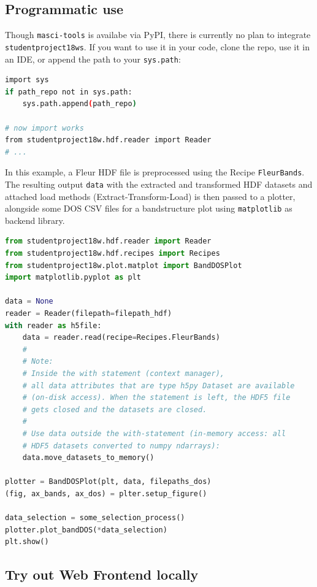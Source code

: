 \subsection{Programmatic use}\label{programmatic-use}

Though \texttt{masci-tools} is availabe via PyPI, there is currently no
plan to integrate \texttt{studentproject18ws}. If you want to use it in
your code, clone the repo, use it in an IDE, or append the path to your
\texttt{sys.path}:

\begin{lstlisting}[language=bash, style=code]
import sys
if path_repo not in sys.path:
    sys.path.append(path_repo)
    
# now import works
from studentproject18w.hdf.reader import Reader
# ...
\end{lstlisting}

In this example, a Fleur HDF file is preprocessed using the Recipe
\texttt{FleurBands}. The resulting output \texttt{data} with the
extracted and transformed HDF datasets and attached load methods
(Extract-Transform-Load) is then passed to a plotter, alongside some DOS
CSV files for a bandstructure plot using \texttt{matplotlib} as backend
library.

\begin{lstlisting}[language=python, style=code]
from studentproject18w.hdf.reader import Reader
from studentproject18w.hdf.recipes import Recipes
from studentproject18w.plot.matplot import BandDOSPlot
import matplotlib.pyplot as plt

data = None
reader = Reader(filepath=filepath_hdf)
with reader as h5file:
    data = reader.read(recipe=Recipes.FleurBands)
    #
    # Note:
    # Inside the with statement (context manager),
    # all data attributes that are type h5py Dataset are available
    # (on-disk access). When the statement is left, the HDF5 file 
    # gets closed and the datasets are closed.
    #
    # Use data outside the with-statement (in-memory access: all 
    # HDF5 datasets converted to numpy ndarrays):
    data.move_datasets_to_memory()

plotter = BandDOSPlot(plt, data, filepaths_dos)
(fig, ax_bands, ax_dos) = plter.setup_figure()

data_selection = some_selection_process()
plotter.plot_bandDOS(*data_selection)
plt.show()
\end{lstlisting}

\subsection{Try out Web Frontend
  locally}\label{try-out-web-frontend-locally}

